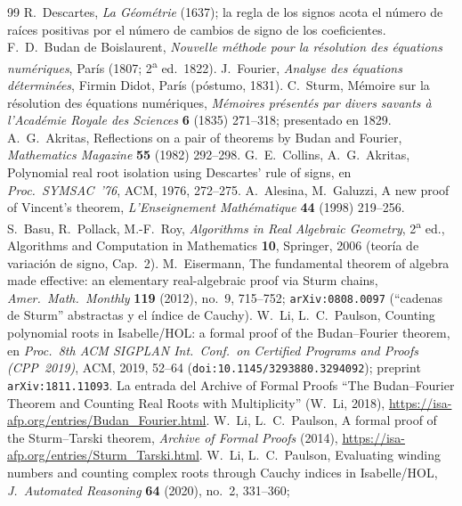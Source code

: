 \documentclass[11pt]{article}
\begin{document}
\begin{thebibliography}{99}\small
{} R.~Descartes, \emph{La G\'eom\'etrie} (1637); la regla de los signos acota el
n\'umero de ra\'ices positivas por el n\'umero de cambios de signo de los coeficientes.
 F.~D.~Budan de Boislaurent, \emph{Nouvelle m\'ethode pour la r\'esolution des
\'equations num\'eriques}, Par\'is (1807; 2\textsuperscript{a} ed.\ 1822).
 J.~Fourier, \emph{Analyse des \'equations d\'etermin\'ees}, Firmin Didot, Par\'is
(p\'ostumo, 1831).
 C.~Sturm, M\'emoire sur la r\'esolution des \'equations num\'eriques, \emph{M\'emoires
pr\'esent\'es par divers savants \`a l'Acad\'emie Royale des Sciences} \textbf{6} (1835) 271--318;
presentado en 1829.
 A.~G.~Akritas, Reflections on a pair of theorems by Budan and Fourier, \emph{Mathematics
Magazine} \textbf{55} (1982) 292--298.
 G.~E.~Collins, A.~G.~Akritas, Polynomial real root isolation using Descartes'
rule of signs, en \emph{Proc.\ SYMSAC~'76}, ACM, 1976, 272--275.
 A.~Alesina, M.~Galuzzi, A new proof of Vincent's theorem, \emph{L'Enseignement
Math\'ematique} \textbf{44} (1998) 219--256.
 S.~Basu, R.~Pollack, M.-F.~Roy, \emph{Algorithms in Real Algebraic Geometry}, 2\textsuperscript{a} ed.,
Algorithms and Computation in Mathematics \textbf{10}, Springer, 2006 (teor\'ia de variaci\'on de signo, Cap.~2).
 M.~Eisermann, The fundamental theorem of algebra made effective: an elementary
real-algebraic proof via Sturm chains, \emph{Amer.\ Math.\ Monthly} \textbf{119} (2012), no.~9,
715--752; \texttt{arXiv:0808.0097} (``cadenas de Sturm'' abstractas y el \'indice de Cauchy).
 W.~Li, L.~C.~Paulson, Counting polynomial roots in Isabelle/HOL: a formal proof of the
Budan--Fourier theorem, en \emph{Proc.\ 8th ACM SIGPLAN Int.\ Conf.\ on Certified Programs and Proofs
(CPP~2019)}, ACM, 2019, 52--64 (\texttt{doi:10.1145/3293880.3294092}); preprint
\texttt{arXiv:1811.11093}. La entrada del Archive of Formal Proofs ``The Budan--Fourier Theorem and
Counting Real Roots with Multiplicity'' (W.~Li, 2018), \url{https://isa-afp.org/entries/Budan_Fourier.html}.
 W.~Li, L.~C.~Paulson, A formal proof of the Sturm--Tarski theorem, \emph{Archive of
Formal Proofs} (2014), \url{https://isa-afp.org/entries/Sturm_Tarski.html}.
 W.~Li, L.~C.~Paulson, Evaluating winding numbers and counting complex roots through
Cauchy indices in Isabelle/HOL, \emph{J.~Automated Reasoning} \textbf{64} (2020), no.~2, 331--360;

\end{thebibliography}
\end{document}
